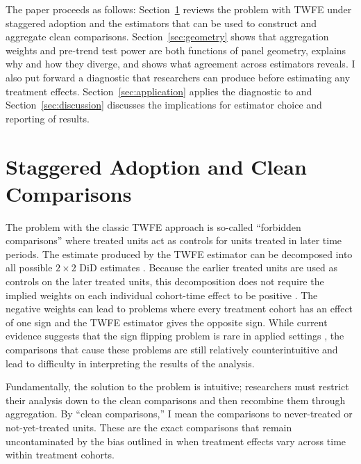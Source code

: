 \documentclass[12pt]{article}
\begin{document}
The paper proceeds as follows: Section~\ref{sec:staggered} reviews the problem with TWFE under staggered adoption and the estimators that can be used to construct and aggregate clean comparisons. Section~\ref{sec:geometry} shows that aggregation weights and pre-trend test power are both functions of panel geometry, explains why and how they diverge, and shows what agreement across estimators reveals. I also put forward a diagnostic that researchers can produce before estimating any treatment effects. Section~\ref{sec:application} applies the diagnostic to \textcite{payson2025residency} and Section~\ref{sec:discussion} discusses the implications for estimator choice and reporting of results.



\section{Staggered Adoption and Clean Comparisons}\label{sec:staggered}


The problem with the classic TWFE approach is so-called ``forbidden comparisons'' where treated units act as controls for units treated in later time periods. The estimate produced by the TWFE estimator can be decomposed into all possible $2\times2$ DiD estimates \parencite{goodman2021difference}. Because the earlier treated units are used as controls on the later treated units, this decomposition does not require the implied weights on each individual cohort-time effect to be positive \parencite{de2020two}. The negative weights can lead to problems where every treatment cohort has an effect of one sign and the TWFE estimator gives the opposite sign. While current evidence suggests that the sign flipping problem is rare in applied settings \parencite{chiu2026causal}, the comparisons that cause these problems are still relatively counterintuitive and lead to difficulty in interpreting the results of the analysis.

Fundamentally, the solution to the problem is intuitive; researchers must restrict their analysis down to the clean comparisons and then recombine them through aggregation. By ``clean comparisons,'' I mean the comparisons to never-treated or not-yet-treated units. These are the exact comparisons that remain uncontaminated by the bias outlined in \textcite{goodman2021difference} when treatment effects vary across time within treatment cohorts. 
\end{document}
